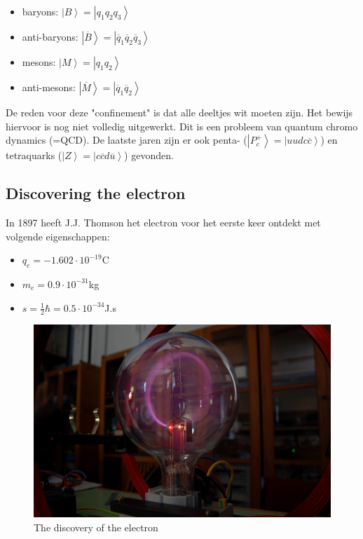 \documentclass[../main.tex]{subfiles}
\begin{document}
\begin{itemize}
    \item baryons: $\left|B\right>=\left|q_1q_2q_3\right>$
    \item anti-baryons: $\left|\overline B\right>=\left|\overline q_1\overline q_2\overline q_3\right>$
    \item mesons: $\left|M\right>=\left|q_1q_2\right>$
    \item anti-mesons: $\left|\overline M\right>=\left|\overline q_1\overline q_2\right>$
\end{itemize}

De reden voor deze "confinement" is dat alle deeltjes wit moeten zijn. Het bewijs hiervoor is nog niet volledig uitgewerkt. Dit is een probleem van quantum chromo dynamics (=QCD). De laatste jaren zijn er ook penta- ($\left|P_c^+\right>=\left|uudc\overline c\right>$) en tetraquarks ($\left|Z\right>=\left|c\overline c d\overline u\right>$) gevonden.

\subsection{Discovering the electron}%
\label{sub:discovering_the_electron}

In 1897 heeft J.J. Thomson het electron voor het eerste keer ontdekt met volgende eigenschappen:
\begin{itemize}
    \item $q_e = -1.602\cdot 10^{-19}$C
    \item $m_e = 0.9\cdot 10^{-31}$kg
    \item $s = \frac{1}{2}\hbar = 0.5\cdot 10^{-34}$J.s
\end{itemize}

\begin{figure}[h]
    \centering
    \includegraphics[width=0.8\linewidth]{introduction_and_review/elec_disc.png}
    \caption{The discovery of the electron}%
    \label{fig:elec_disc}
\end{figure}
\end{document}
